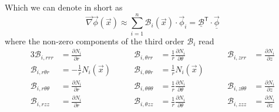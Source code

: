 \documentclass[times,namecite]{goose-article}
\begin{document}
Which we can denote in short as
\begin{equation}
  \vec{\nabla} \vec{\phi} (\vec{x})
  \approx
  \sum\limits_{i=1}^{n}
  \mathcal{B}_i (\vec{x}) \cdot \vec{\phi}_i
  =
  \underline{\mathcal{B}}^\mathsf{T} \cdot \underline{\vec{\phi}}
\end{equation}
where the non-zero components of the third order $\mathcal{B}_i$ read
\begin{alignat}{3}
  \mathcal{B}_{i,r      r      r     } &=             \frac{\partial N_i}{\partial r}      & \qquad
  \mathcal{B}_{i,\theta r      r     } &= \frac{1}{r} \frac{\partial N_i}{\partial \theta} & \qquad
  \mathcal{B}_{i,z      r      r     } &=             \frac{\partial N_i}{\partial z}
  \nonumber
  \\
  \mathcal{B}_{i,r      \theta r     } &= - \frac{1}{r} N_i (\vec{x})  & \qquad
  \mathcal{B}_{i,\theta \theta r     } &=   \frac{1}{r} N_i (\vec{x})  & \qquad
  \nonumber
  \\
  \mathcal{B}_{i,r      \theta \theta} &=             \frac{\partial N_i}{\partial r}       & \qquad
  \mathcal{B}_{i,\theta \theta \theta} &= \frac{1}{r} \frac{\partial N_i}{\partial \theta}  & \qquad
  \mathcal{B}_{i,z      \theta \theta} &=             \frac{\partial N_i}{\partial z}
  \\
  \mathcal{B}_{i,r      z      z     } &=             \frac{\partial N_i}{\partial r}       & \qquad
  \mathcal{B}_{i,\theta z      z     } &= \frac{1}{r} \frac{\partial N_i}{\partial \theta}  & \qquad
  \mathcal{B}_{i,z      z      z     } &=             \frac{\partial N_i}{\partial z}
\end{alignat}
\end{document}
